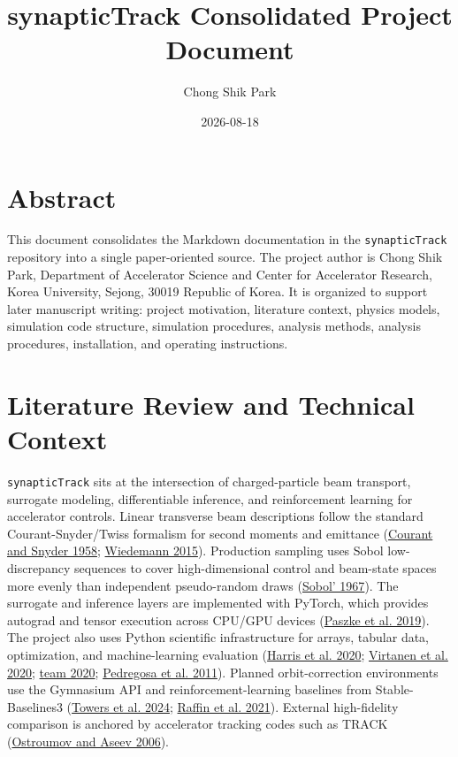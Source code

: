 \documentclass[
]{article}
\title{synapticTrack Consolidated Project Document}
\author{Chong Shik Park}
\date{2026-08-18}
\begin{document}
\maketitle

\hypertarget{abstract}{%
\section{Abstract}\label{abstract}}

This document consolidates the Markdown documentation in the
\texttt{synapticTrack} repository into a single paper-oriented source.
The project author is Chong Shik Park, Department of Accelerator Science
and Center for Accelerator Research, Korea University, Sejong, 30019
Republic of Korea. It is organized to support later manuscript writing:
project motivation, literature context, physics models, simulation code
structure, simulation procedures, analysis methods, analysis procedures,
installation, and operating instructions.

\hypertarget{literature-review-and-technical-context}{%
\section{Literature Review and Technical
Context}\label{literature-review-and-technical-context}}

\texttt{synapticTrack} sits at the intersection of charged-particle beam
transport, surrogate modeling, differentiable inference, and
reinforcement learning for accelerator controls. Linear transverse beam
descriptions follow the standard Courant-Snyder/Twiss formalism for
second moments and emittance
(\protect\hyperlink{ref-courant1958theory}{Courant and Snyder 1958};
\protect\hyperlink{ref-wiedemann2015particle}{Wiedemann 2015}).
Production sampling uses Sobol low-discrepancy sequences to cover
high-dimensional control and beam-state spaces more evenly than
independent pseudo-random draws
(\protect\hyperlink{ref-sobol1967distribution}{Sobol' 1967}). The
surrogate and inference layers are implemented with PyTorch, which
provides autograd and tensor execution across CPU/GPU devices
(\protect\hyperlink{ref-paszke2019pytorch}{Paszke et al. 2019}). The
project also uses Python scientific infrastructure for arrays, tabular
data, optimization, and machine-learning evaluation
(\protect\hyperlink{ref-harris2020array}{Harris et al. 2020};
\protect\hyperlink{ref-virtanen2020scipy}{Virtanen et al. 2020};
\protect\hyperlink{ref-pandas2020}{team 2020};
\protect\hyperlink{ref-pedregosa2011scikit}{Pedregosa et al. 2011}).
Planned orbit-correction environments use the Gymnasium API and
reinforcement-learning baselines from Stable-Baselines3
(\protect\hyperlink{ref-towers2024gymnasium}{Towers et al. 2024};
\protect\hyperlink{ref-raffin2021stable}{Raffin et al. 2021}). External
high-fidelity comparison is anchored by accelerator tracking codes such
as TRACK (\protect\hyperlink{ref-ostroumov2006track}{Ostroumov and Aseev
2006}).
\end{document}
